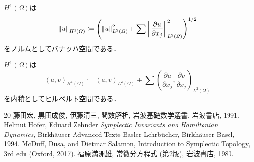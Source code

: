 \begin{THM}
    \(H^1(\varOmega)\)は
    \[
        \norm[u]_{H^1(\varOmega)}
        \coloneqq
        \left(
            \norm[u]_{L^2(\varOmega)}^{2}+
            \sum
            \norm[\frac{\partial u}{\partial x_j}]_{L^2(\varOmega)}^{2}
        \right)^{1/2}
    \]
    をノルムとしてバナッハ空間である．
\end{THM}
\begin{EG*}
    \(H^1(\varOmega)\)は
    \[
        (u,v)_{H^1(\varOmega)}
        \coloneqq
        (u,v)_{L^2(\varOmega)}
        +\sum(
            \frac{\partial u}{\partial x_j},
            \frac{\partial v}{\partial x_j}
        )_{L^2(\varOmega)}
    \]
    を内積としてヒルベルト空間である．    
\end{EG*}
\begin{thebibliography}{20} 
     藤田宏, 黒田成俊, 伊藤清三, 
    関数解析, 岩波基礎数学選書, 岩波書店, 1991.
    Helmut Hofer, Eduard Zehnder
    \textit{Symplectic Invariants and Hamiltonian Dynamics}, 
    Birkh\"auser Advanced Texts Basler Lehrb\"ucher, Birkh\"auser Basel, 1994.
     McDuff, Dusa, 
    and Dietmar Salamon, 
    Introduction to Symplectic Topology, 
    3rd edn (Oxford, 2017).
     福原満洲雄, 常微分方程式 (第2版), 岩波書店, 1980.
\end{thebibliography}





